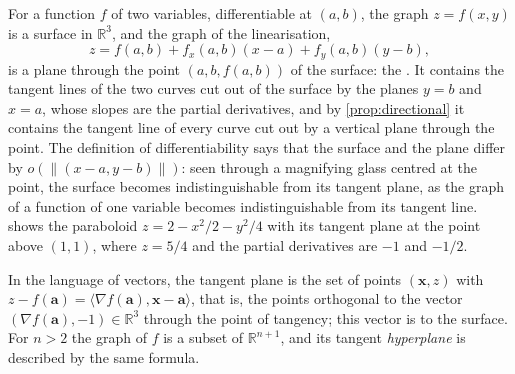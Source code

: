 For a function $f$ of two variables, differentiable at $(a,b)$, the graph $z=f(x,y)$ is a surface in $\mathbb R^3$, and the graph of the linearisation,
\[
z=f(a,b)+f_x(a,b)(x-a)+f_y(a,b)(y-b),
\]
is a plane through the point $(a,b,f(a,b))$ of the surface: the . It contains the tangent lines of the two curves cut out of the surface by the planes $y=b$ and $x=a$, whose slopes are the partial derivatives, and by \cref{prop:directional} it contains the tangent line of every curve cut out by a vertical plane through the point. The definition of differentiability says that the surface and the plane differ by $o(\|(x-a,y-b)\|)$: seen through a magnifying glass centred at the point, the surface becomes indistinguishable from its tangent plane, as the graph of a function of one variable becomes indistinguishable from its tangent line.  shows the paraboloid $z=2-x^2/2-y^2/4$ with its tangent plane at the point above $(1,1)$, where $z=5/4$ and the partial derivatives are $-1$ and $-1/2$.

In the language of vectors, the tangent plane is the set of points $(\mathbf x,z)$ with $z-f(\mathbf a)=\langle\nabla f(\mathbf a),\mathbf x-\mathbf a\rangle$, that is, the points orthogonal to the vector $(\nabla f(\mathbf a),-1)\in\mathbb R^3$ through the point of tangency; this vector is  to the surface. For $n>2$ the graph of $f$ is a subset of $\mathbb R^{n+1}$, and its tangent \emph{hyperplane} is described by the same formula.

